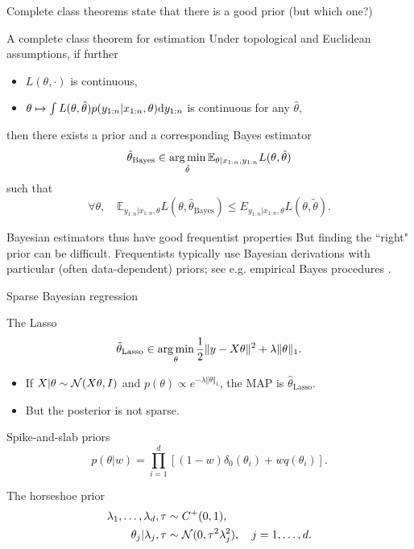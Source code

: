 \documentclass[10pt]{beamer}
\begin{document}
\begin{frame}{Complete class theorems state that there is a good prior (but which one?)}

\begin{block}{A complete class theorem for estimation \citep{Ber85}}
Under topological and Euclidean assumptions, if further \begin{itemize}
\item $L(\theta,\cdot)$ is continuous,
\item $\theta\mapsto \int L(\theta,\hat\theta)p(y_{1:n} \vert x_{1:n}, \theta){\rm d} y_{1:n}$ is continuous for any $\hat\theta$,
\end{itemize}
then  there exists a prior and a corresponding Bayes estimator
$$
\hat\theta_{\text{Bayes}} \in \operatorname*{arg\,min}_{\hat\theta} \mathbb{E}_{\theta\vert x_{1:n},y_{1:n}} L(\theta,\hat\theta)
$$
such that
$$ \forall \theta, \quad \mathbb E_{y_{1:n}\vert x_{1:n},\theta} L(\theta,\hat\theta_{\text{Bayes}}) \leq E_{y_{1:n}\vert x_{1:n},\theta} L(\theta,\tilde\theta).$$
\end{block}
\begin{alertblock}{Bayesian estimators thus have good frequentist properties}
But finding the ``right" prior can be difficult. Frequentists typically use Bayesian derivations with particular (often data-dependent) priors; see e.g. empirical Bayes procedures \citep{Efr10}.
\end{alertblock}
\end{frame}

\begin{frame}{Sparse Bayesian regression}
\begin{block}{The Lasso}
$$ 
\hat\theta_{\text{Lasso}} \in \operatorname*{arg\,min}_\theta \frac12 \Vert y -X\theta\Vert^2 + \lambda \Vert \theta\Vert_1.
$$
\end{block}
\begin{itemize}
\item If $X\vert\theta \sim \mathcal{N}(X\theta, I)$ and $p(\theta) \propto e^{-\lambda\Vert \theta\Vert_1}$, the MAP is $\hat\theta_{\text{Lasso}}$.
\item But the posterior is not sparse.
\end{itemize}
\begin{block}{Spike-and-slab priors}
  \vspace{-5pt}
  $$
    p(\theta\vert w) = \prod_{i=1}^d \left[(1-w)\delta_0(\theta_i) + w q(\theta_i)\right].
  $$
\end{block}

\begin{block}{The horseshoe prior \citep{CaPoSc10}}
  \vspace{-15pt}
  \begin{align*}
    \lambda_1, \dots, \lambda_d, \tau & \sim C^+(0,1), \\
    \theta_j\vert \lambda_j, \tau &\sim \mathcal{N}(0, \tau^2 \lambda_j^2), \quad j=1,\dots, d.
  \end{align*}
\end{block}
\end{frame}
\end{document}
